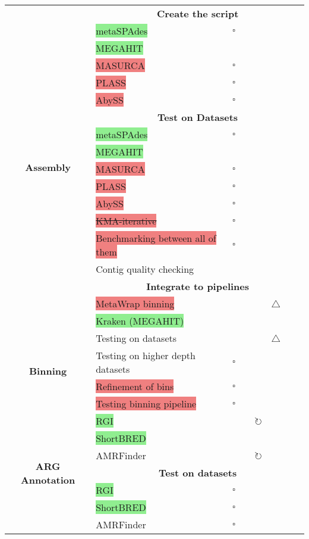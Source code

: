 \documentclass[11pt]{report}
\newcommand{\done}{\checkmark}
\newcommand{\pending}{$\square$}
\newcommand{\refine}{$\circlearrowright$}
\newcommand{\issue}{$\triangle$}
\newcommand{\draft}{\faPencil}
\newcommand{\highlightessential}[1]{\colorbox{lightgreen}{#1}}
\newcommand{\highlightoptional}[1]{\colorbox{lightorange}{#1}}
\newcommand{\highlightrobust}[1]{\colorbox{lightcoral}{#1}}
\newcommand{\deprecated}[1]{\sout{#1}}
\begin{document}
\begin{longtable}{|c|p{8cm}|c|c|c|c|c|c|}
	\multirow{18}{*}{\textbf{Assembly}} 
	& \multicolumn{7}{c|}{\textbf{Create the script}} \\
	& \highlightessential{metaSPAdes} & \pending & & & & & \\ 
	& \highlightessential{MEGAHIT} & & & & & & \done \\
	& \highlightrobust{MASURCA} & \pending & & & & & \\ 
	& \highlightrobust{PLASS} & \pending & & & & & \\ 
	& \highlightrobust{AbySS} & \pending & & & & & \\ 
	& \multicolumn{7}{c|}{\textbf{Test on Datasets}} \\
	& \highlightessential{metaSPAdes} & \pending & & & & & \\ 
	& \highlightessential{MEGAHIT} & & & & & & \done \\ 
	& \highlightrobust{MASURCA} & \pending & & & & & \\ 
	& \highlightrobust{PLASS} & \pending & & & & & \\ 
	& \highlightrobust{AbySS} & \pending & & & & & \\ 
	& \highlightrobust{\deprecated{KMA-iterative}} & \pending & & & & & \\
	& \highlightrobust{Benchmarking between all of them} & \pending & & & & & \\
	& \highlightoptional{Contig quality checking} & & \draft & & & & \\ 
	& \multicolumn{7}{c|}{\textbf{Integrate to pipelines}} \\
	& \highlightrobust{MetaWrap binning} & & & & \issue & & \\
	& \highlightessential{Kraken (MEGAHIT)} & & & & & & \done \\ \hline
	
	\multirow{4}{*}{\textbf{Binning}} 
	& \highlightoptional{Testing on datasets} & & & & \issue & & \\
	& \highlightoptional{Testing on higher depth datasets} & \pending & & & & & \\
	& \highlightrobust{Refinement of bins} & \pending & & & & & \\ 
	& \highlightrobust{Testing binning pipeline} & \pending & & & & & \\ \hline
	
	\multirow{7}{*}{\textbf{ARG Annotation}} 
	& \highlightessential{RGI} & & & \refine & & & \\ 
	& \highlightessential{ShortBRED} & & & & & & \done \\
	& \highlightoptional{AMRFinder} & & & \refine & & & \\ 
	& \multicolumn{7}{c|}{\textbf{Test on datasets}} \\
	& \highlightessential{RGI} & \pending & & & & & \\
	& \highlightessential{ShortBRED} & \pending & & & & & \\
	& \highlightoptional{AMRFinder} & \pending & & & & & \\ \hline
	
\end{longtable}
\end{document}
